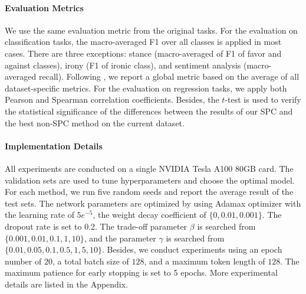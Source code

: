 \documentclass[letterpaper]{article} %
\begin{document}
\paragraph{Evaluation Metrics} \label{sec:eval}
We use the same evaluation metric from the original tasks.
For the evaluation on classification tasks, the macro-averaged F1 over all classes is applied in most cases. There are three exceptions: stance (macro-averaged of F1 of favor and against classes), irony (F1 of ironic class), and sentiment analysis (macro-averaged recall).
Following \citet{DBLP:conf/emnlp/BarbieriCAN20},
we report a global metric based on the average of all dataset-specific metrics.
For the evaluation on regression tasks,
we apply both Pearson and Spearman correlation coefficients.
Besides, the $t$-test \cite{kim2015t} is used to verify the statistical significance of the differences between the results of our SPC and the best non-SPC method on the current dataset.


\paragraph{Implementation Details}
All experiments are conducted on a single NVIDIA Tesla A100 80GB card.
The validation sets are used to tune hyperparameters and choose the optimal model.
For each method, we run five random seeds and report the average result of the test sets.
The network parameters are optimized by using Adamax optimizer \citep{DBLP:journals/corr/KingmaB14} with the learning rate of $5e^{-5}$, the weight decay coefficient of $\{0, 0.01, 0.001\}$. The dropout rate is set to 0.2.
The trade-off parameter $\beta$ is searched from $\{0.001, 0.01, 0.1, 1, 10\}$, and the parameter $\gamma$  is searched from $\{0.01, 0.05, 0.1, 0.5, 1, 5, 10\}$.
Besides, we conduct experiments using an epoch number of $20$, a total batch size of $128$, and a maximum token length of $128$.
The maximum patience for early stopping is set to 5 epochs.
More experimental details are listed in the Appendix.
\end{document}

